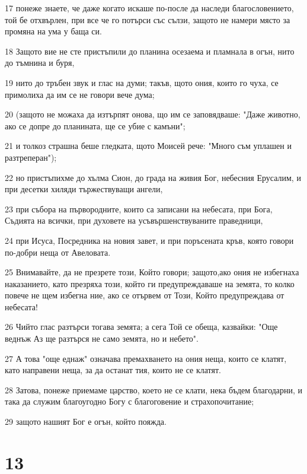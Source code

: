 \par 17 понеже знаете, че даже когато искаше по-после да наследи благословението, той бе отхвърлен, при все че го потърси със сълзи, защото не намери място за промяна на ума у баща си.
\par 18 Защото вие не сте пристъпили до планина осезаема и пламнала в огън, нито до тъмнина и буря,
\par 19 нито до тръбен звук и глас на думи; такъв, щото ония, които го чуха, се примолиха да им се не говори вече дума;
\par 20 (защото не можаха да изтърпят онова, що им се заповядваше: "Даже животно, ако се допре до планината, ще се убие с камъни";
\par 21 и толкоз страшна беше гледката, щото Моисей рече: "Много съм уплашен и разтреперан");
\par 22 но пристъпихме до хълма Сион, до града на живия Бог, небесния Ерусалим, и при десетки хиляди тържествуващи ангели,
\par 23 при събора на първородните, които са записани на небесата, при Бога, Съдията на всички, при духовете на усъвършенствуваните праведници,
\par 24 при Исуса, Посредника на новия завет, и при поръсената кръв, която говори по-добри неща от Авеловата.
\par 25 Внимавайте, да не презрете този, Който говори; защото,ако ония не избегнаха наказанието, като презряха този, който ги предупреждаваше на земята, то колко повече не щем избегна ние, ако се отървем от Този, Който предупреждава от небесата!
\par 26 Чийто глас разтърси тогава земята; а сега Той се обеща, казвайки: "Още веднъж Аз ще разтърся не само земята, но и небето".
\par 27 А това "още еднаж" означава премахването на ония неща, които се клатят, като направени неща, за да останат тия, които не се клатят.
\par 28 Затова, понеже приемаме царство, което не се клати, нека бъдем благодарни, и така да служим благоугодно Богу с благоговение и страхопочитание;
\par 29 защото нашият Бог е огън, който пояжда.

\chapter{13}

